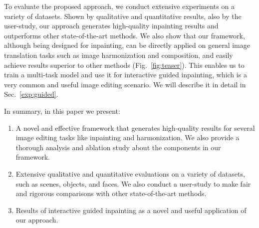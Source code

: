 To evaluate the proposed approach, we conduct extensive experiments on a variety of datasets. Shown by qualitative and quantitative results, also by the user-study, our approach generates high-quality inpainting results and outperforms other state-of-the-art methods.  We also show that our framework, although being designed for inpainting, can be directly applied on general image translation tasks such as image harmonization and composition, and easily achieve results superior to other methods (Fig.~\ref{fig:teaser}). This enables us to train a multi-task model and use it for interactive guided inpainting, which is a very common and useful image editing scenario. We will describe it in detail in Sec.~\ref{exp:guided}.

In summary, in this paper we present:
\begin{enumerate}
\item A novel and effective framework that generates high-quality results for several image editing tasks like inpainting and harmonization. We also provide a thorough analysis and ablation study about the components in our framework.  
\item Extensive qualitative and quantitative evaluations on a variety of datasets, such as scenes, objects, and faces. We also conduct a user-study to make fair and rigorous comparisons with other state-of-the-art methods. 
\item Results of interactive guided inpainting as a novel and useful application of our approach. 
\end{enumerate}